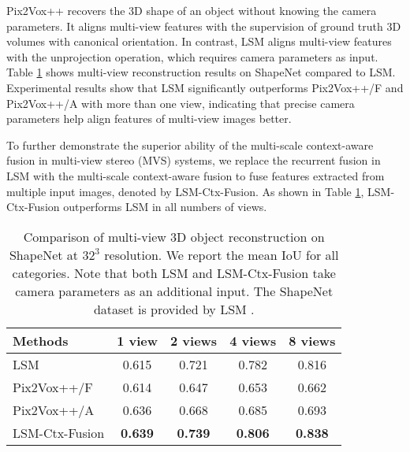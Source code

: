 \documentclass[twocolumn]{svjour3}
\begin{document}
Pix2Vox++ recovers the 3D shape of an object without knowing the camera parameters.
It aligns multi-view features with the supervision of ground truth 3D volumes with canonical orientation.
In contrast, LSM \citep{DBLP:conf/nips/KarHM17} aligns multi-view features with the unprojection operation, which requires camera parameters as input.
Table \ref{tab:lsm-multi-view-reconstruction} shows multi-view reconstruction results on ShapeNet compared to LSM.
Experimental results show that LSM significantly outperforms Pix2Vox++/F and Pix2Vox++/A with more than one view, indicating that precise camera parameters help align features of multi-view images better.

To further demonstrate the superior ability of the multi-scale context-aware fusion in multi-view stereo (MVS) systems, we replace the recurrent fusion in LSM with the multi-scale context-aware fusion to fuse features extracted from multiple input images, denoted by LSM-Ctx-Fusion.
As shown in Table \ref{tab:lsm-multi-view-reconstruction}, LSM-Ctx-Fusion outperforms LSM in all numbers of views.

\begin{table}
  \centering
  \caption{Comparison of multi-view 3D object reconstruction on ShapeNet at $32^3$ resolution. We report the mean IoU for all categories. Note that both LSM and LSM-Ctx-Fusion take camera parameters as an additional input. The ShapeNet dataset is provided by LSM \citep{DBLP:conf/nips/KarHM17}.}
  \begin{tabularx}{\linewidth}{lcccc}
    \toprule
    Methods        & 1 view    & 2 views   & 4 views   & 8 views\\
    \midrule
    LSM            & 0.615     & 0.721     & 0.782     & 0.816 \\
    Pix2Vox++/F    & 0.614     & 0.647     & 0.653     & 0.662 \\
    Pix2Vox++/A    & 0.636     & 0.668     & 0.685     & 0.693 \\
    \midrule
    LSM-Ctx-Fusion & \bf{0.639}& \bf{0.739}& \bf{0.806}& \bf{0.838}\\
    \bottomrule
  \end{tabularx}
  \label{tab:lsm-multi-view-reconstruction}
\end{table}
\end{document}
